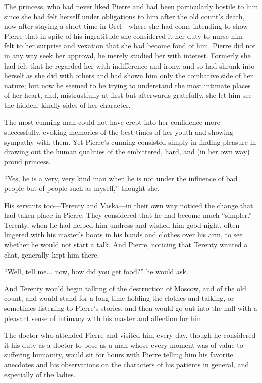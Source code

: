 The princess, who had never liked Pierre and had been
particularly hostile to him since she had felt herself under
obligations to him after the old count's death, now after staying
a short time in Orel---where she had come intending to show
Pierre that in spite of his ingratitude she considered it her
duty to nurse him---felt to her surprise and vexation that she
had become fond of him. Pierre did not in any way seek her
approval, he merely studied her with interest. Formerly she had
felt that he regarded her with indifference and irony, and so had
shrunk into herself as she did with others and had shown him only
the combative side of her nature; but now he seemed to be trying
to understand the most intimate places of her heart, and,
mistrustfully at first but afterwards gratefully, she let him see
the hidden, kindly sides of her character.

The most cunning man could not have crept into her confidence
more successfully, evoking memories of the best times of her
youth and showing sympathy with them. Yet Pierre's cunning
consisted simply in finding pleasure in drawing out the human
qualities of the embittered, hard, and (in her own way) proud
princess.

``Yes, he is a very, very kind man when he is not under the
influence of bad people but of people such as myself,'' thought
she.

His servants too---Terenty and Vaska---in their own way noticed
the change that had taken place in Pierre. They considered that
he had become much ``simpler.'' Terenty, when he had helped him
undress and wished him good night, often lingered with his
master's boots in his hands and clothes over his arm, to see
whether he would not start a talk. And Pierre, noticing that
Terenty wanted a chat, generally kept him there.

``Well, tell me... now, how did you get food?'' he would ask.

And Terenty would begin talking of the destruction of Moscow, and
of the old count, and would stand for a long time holding the
clothes and talking, or sometimes listening to Pierre's stories,
and then would go out into the hall with a pleasant sense of
intimacy with his master and affection for him.

The doctor who attended Pierre and visited him every day, though
he considered it his duty as a doctor to pose as a man whose
every moment was of value to suffering humanity, would sit for
hours with Pierre telling him his favorite anecdotes and his
observations on the characters of his patients in general, and
especially of the ladies.

